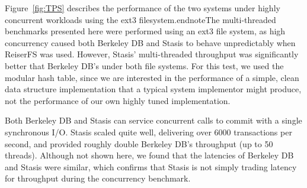 \documentclass[letterpaper,twocolumn,10pt]{article}
\newcommand{\yad}{Stasis\xspace}
\newcommand{\yads}{Stasis'\xspace}
\begin{document}


Figure~\ref{fig:TPS} describes the performance of the two systems under
highly concurrent workloads using the ext3 filesystem.endnote{The multi-threaded benchmarks
  presented here were performed using an ext3 file system, as high
  concurrency caused both Berkeley DB and \yad to behave unpredictably
  when ReiserFS was used.  However, \yads multi-threaded throughput
  was significantly better that Berkeley DB's under both file systems.}
  For this test, we used the modular
hash table, since we are interested in the performance of a 
simple, clean data structure implementation that a typical system implementor might
produce, not the performance of our own highly tuned implementation.

Both Berkeley DB and \yad can service concurrent calls to commit with
a single synchronous I/O.
\yad scaled quite well, delivering over 6000 transactions per
second,  and provided roughly
double Berkeley DB's throughput (up to 50 threads).  Although not
shown here, we found that the latencies of Berkeley DB and \yad were
similar, which confirms that \yad is not simply trading latency for
throughput during the concurrency benchmark.
\end{document}
